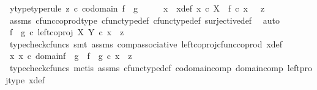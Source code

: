 \begin{isabellebody}
\ y{\isacharunderscore}{\kern0pt}type{\isacharbrackleft}{\kern0pt}type{\isacharunderscore}{\kern0pt}rule{\isacharbrackright}{\kern0pt}{\isacharcolon}{\kern0pt}\ {\isachardoublequoteopen}z\ {\isasymin}\isactrlsub c\ codomain\ {\isacharparenleft}{\kern0pt}f\ {\isasymamalg}\ g{\isacharparenright}{\kern0pt}{\isachardoublequoteclose}\isanewline
\ \ \isamarkupfalse%
\ \isamarkupfalse%
\ x\ \ x{\isacharunderscore}{\kern0pt}def{\isacharcolon}{\kern0pt}\ {\isachardoublequoteopen}x\ {\isasymin}\isactrlsub c\ X\ {\isasymand}\ f\ {\isasymcirc}\isactrlsub c\ x\ \ {\isacharequal}{\kern0pt}\ z{\isachardoublequoteclose}\isanewline
\ \ \ \ \isamarkupfalse%
\ assms\ cfunc{\isacharunderscore}{\kern0pt}coprod{\isacharunderscore}{\kern0pt}type\ cfunc{\isacharunderscore}{\kern0pt}type{\isacharunderscore}{\kern0pt}def\ cfunc{\isacharunderscore}{\kern0pt}type{\isacharunderscore}{\kern0pt}def\ surjective{\isacharunderscore}{\kern0pt}def\ \isamarkupfalse%
\ auto\isanewline
\ \ \isamarkupfalse%
\ {\isachardoublequoteopen}{\isacharparenleft}{\kern0pt}f\ {\isasymamalg}\ g{\isacharparenright}{\kern0pt}\ {\isasymcirc}\isactrlsub c\ {\isacharparenleft}{\kern0pt}left{\isacharunderscore}{\kern0pt}coproj\ X\ Y\ {\isasymcirc}\isactrlsub c\ x{\isacharparenright}{\kern0pt}\ {\isacharequal}{\kern0pt}\ z{\isachardoublequoteclose}\isanewline
\ \ \ \ \isamarkupfalse%
\ {\isacharparenleft}{\kern0pt}typecheck{\isacharunderscore}{\kern0pt}cfuncs{\isacharcomma}{\kern0pt}\ smt\ assms\ comp{\isacharunderscore}{\kern0pt}associative{}\ left{\isacharunderscore}{\kern0pt}coproj{\isacharunderscore}{\kern0pt}cfunc{\isacharunderscore}{\kern0pt}coprod\ x{\isacharunderscore}{\kern0pt}def{\isacharparenright}{\kern0pt}\isanewline
\ \ \isamarkupfalse%
\ \isamarkupfalse%
\ {\isachardoublequoteopen}{\isasymexists}x{\isachardot}{\kern0pt}\ x\ {\isasymin}\isactrlsub c\ domain{\isacharparenleft}{\kern0pt}f\ {\isasymamalg}\ g{\isacharparenright}{\kern0pt}\ {\isasymand}\ f\ {\isasymamalg}\ g\ {\isasymcirc}\isactrlsub c\ x\ {\isacharequal}{\kern0pt}\ z{\isachardoublequoteclose}\isanewline
\ \ \ \ \isamarkupfalse%
\ {\isacharparenleft}{\kern0pt}typecheck{\isacharunderscore}{\kern0pt}cfuncs{\isacharcomma}{\kern0pt}\ metis\ assms{\isacharparenleft}{\kern0pt}{}{\isacharcomma}{\kern0pt}{}{\isacharparenright}{\kern0pt}\ cfunc{\isacharunderscore}{\kern0pt}type{\isacharunderscore}{\kern0pt}def\ codomain{\isacharunderscore}{\kern0pt}comp\ domain{\isacharunderscore}{\kern0pt}comp\ left{\isacharunderscore}{\kern0pt}proj{\isacharunderscore}{\kern0pt}type\ x{\isacharunderscore}{\kern0pt}def{\isacharparenright}{\kern0pt}\isanewline

\end{isabellebody}
